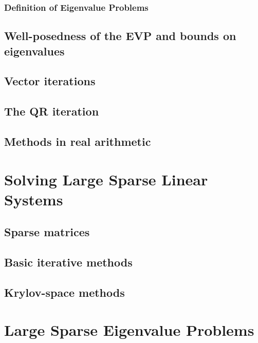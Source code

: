 \subsection{Definition of Eigenvalue Problems}

\section{Well-posedness of the EVP and bounds on eigenvalues}


\section{Vector iterations}


\section{The QR iteration}


\section{Methods in real arithmetic}


%

\chapter{Solving Large Sparse Linear Systems}
\label{chap:sparse}

\section{Sparse matrices}



\section{Basic iterative methods}


\section{Krylov-space methods}


\chapter{Large Sparse Eigenvalue Problems}
\label{chap:sparse-eigen}


